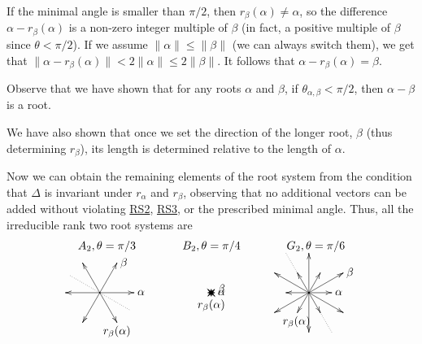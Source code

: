 If the minimal angle is smaller than $\pi/2$, then $r_\beta(\alpha)\neq \alpha$, so
 the difference $\alpha - r_\beta(\alpha)$ is a non-zero integer multiple of $\beta$
 (in fact, a positive multiple of $\beta$ since $\theta < \pi/2$). If we assume
 $\|\alpha\|\le \|\beta\|$ (we can always switch them), we get that $\|\alpha -
 r_\beta(\alpha)\|<2\|\alpha\|\le 2\|\beta\|$. It follows that
 $\alpha-r_\beta(\alpha)=\beta$.
 \begin{remark}\label{lec14R:acute}
   Observe that we have shown that for any roots $\alpha$ and $\beta$, if
   $\theta_{\alpha,\beta}<\pi/2$, then $\alpha-\beta$ is a root.
 \end{remark}
 \begin{remark}\label{lec14Rmkrank2}
   We have also shown that once we set the direction of the longer root, $\beta$ (thus
   determining $r_\beta$), its length is determined relative to the length of
   $\alpha$.
 \end{remark}
 Now we can obtain the remaining elements of the root system from the
 condition that $\Delta$ is invariant under $r_\alpha$ and $r_\beta$, observing that
 no additional vectors can be added without violating \hyperlink{RS2}{RS2},
 \hyperlink{RS3}{RS3}, or the prescribed minimal angle. Thus, all the irreducible rank
 two root systems are
 \[\begin{array}{ccccc}
   A_2, \theta = \pi/3 &\quad & B_2, \theta = \pi/4 &\quad & G_2, \theta=\pi/6\\
   \begin{xy}
   <3em,0em>:(0,0)="c";
   a(150);a(-30) **@{.},
   \ar "c";a(0) *+!L{\alpha}
   \ar "c";a(60) *+!L{\beta}
   \ar "c";a(120)
   \ar "c";a(180)
   \ar "c";a(-60) *+!U{r_\beta(\alpha)}
   \ar "c";a(-120)
 \end{xy} & &
 \begin{xy}
   (-1.3,1.3);(-1,1) **@{.},
   (1.3,-1.3);(1,-1) **@{.};
   (0,0);(0,0);
   \ar (1,0) *+!L{\alpha},
   \ar (1,1) *+!L{\beta},
   \ar (0,1),
   \ar (-1,1),
   \ar (-1,0),
   \ar (-1,-1),
   \ar (0,-1) *+!U{r_\beta (\alpha)},
   \ar (1,-1),
 \end{xy} & &
 \begin{xy}
   <2em,0em>:
   a(120)+a(120);a(120) **@{.},
   a(-60)+a(-60);a(-60) **@{.},
   (0,0);(0,0);
   \ar (1,0) ="a" *+!L{\alpha},
   \ar a(120) -"a"="b",
   \ar "b"+"a",
   \ar "b"+"a"+"a",
   \ar "b"+"a"+"a"+"a" *+!L{\beta},
   \ar "b"+"b"+"a"+"a"+"a",
   \ar -"a",
   \ar -"b",
   \ar -"b"-"a",
   \ar -"b"-"a"-"a" *+!U{r_\beta (\alpha)\,},
   \ar -"b"-"a"-"a"-"a",
   \ar -"b"-"b"-"a"-"a"-"a",
 \end{xy}
 \end{array}\]

